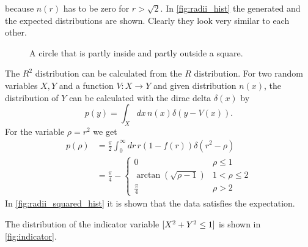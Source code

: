 because $n(r)$ has to be zero for $r > \sqrt 2$. 
In \cref{fig:radii_hist} the generated and the expected distributions are shown. 
Clearly they look very similar to each other.\par
%
\begin{figure}[h]
    \centering
    \caption{A circle that is partly inside and partly outside a square.}
    \label{fig:circle_square}
\end{figure}
%
The $R^2$ distribution can be calculated from the $R$ distribution. For two random variables $X, Y$ and 
a function $V: X \rightarrow Y$ and given distribution $n(x)$, the distribution of 
$Y$ can be calculated with the dirac delta $\delta(x)$ by 
\[
    p(y) = \int_X dx\, n(x) \delta(y - V(x)).
\] 
For the variable $\rho = r^2$ we get 
\begin{align*}
    p(\rho) &= \frac \pi 2 \int_0^{\infty} dr\, r(1-f(r)) \delta(r^2 - \rho) \\
    &= \frac \pi 4 - 
    \begin{cases}
        0 & \rho \leq 1 \\
        \arctan(\sqrt{\rho - 1}) & 1 < \rho \leq 2 \\
        \frac{\pi}{4} & \rho > 2
    \end{cases}
\end{align*}
In \cref{fig:radii_squared_hist} it is shown that the data satisfies the expectation.\par 
The distribution of the indicator variable $[X^2 + Y^2 \leq 1]$ is shown in \cref{fig:indicator}.
%
